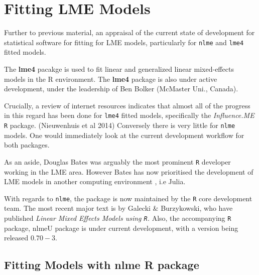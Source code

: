 \documentclass[Main.tex]{subfiles}
\begin{document}
\setcounter{tocdepth}{1}

\tableofcontents
	
\chapter{Fitting LME Models}
Further to previous material, an appraisal of the current state of development for statistical software for fitting for LME models, particularly for \texttt{nlme} and \texttt{lme4} fitted models.


The \textbf{lme4} pacakge is used to fit linear and generalized linear mixed-effects models in the R environment.
The \textbf{lme4} package is also under active development, under the leadership of Ben Bolker (McMaster Uni., Canada).


Crucially, a review of internet resources indicates that almost all of the progress in this regard has been done for \texttt{lme4} fitted models, specifically the \textit{Influence.ME} \texttt{R} package. (Nieuwenhuis et al 2014)
Conversely there is very little for \texttt{nlme} models. One would immediately look at the current development workflow for both packages.


As an aside, Douglas Bates was arguably the most prominent \texttt{R} developer working in the LME area. 
However Bates has now prioritised the development of LME models in another computing environment , i.e Julia. 


With regards to \texttt{nlme}, the package is now maintained by the \texttt{R} core development team. The most recent major text is by Galecki \& Burzykowski, who have published \textit{ Linear Mixed Effects Models using \texttt{R}. }
Also, the accompanying \texttt{R} package, nlmeU package is under current development, with a version being released $0.70-3$.


\section{Fitting Models with nlme R package}
\end{document}
